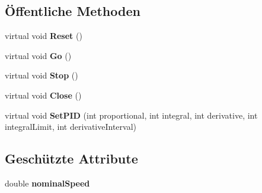 \subsection*{Öffentliche Methoden}
\begin{DoxyCompactItemize}
\item 
\hypertarget{class_robot_ctrl_1_1_motor_ctrl_a57b1bb7cb3895bc5d867848926b57f1e}{
virtual void {\bfseries Reset} ()}
\label{class_robot_ctrl_1_1_motor_ctrl_a57b1bb7cb3895bc5d867848926b57f1e}

\item 
\hypertarget{class_robot_ctrl_1_1_motor_ctrl_a1c2505454168fc2d4287fe7052425d4e}{
virtual void {\bfseries Go} ()}
\label{class_robot_ctrl_1_1_motor_ctrl_a1c2505454168fc2d4287fe7052425d4e}

\item 
\hypertarget{class_robot_ctrl_1_1_motor_ctrl_a4e61bcac558a43dd2d1470ded5fed820}{
virtual void {\bfseries Stop} ()}
\label{class_robot_ctrl_1_1_motor_ctrl_a4e61bcac558a43dd2d1470ded5fed820}

\item 
\hypertarget{class_robot_ctrl_1_1_motor_ctrl_aa4d43c3586f611f8ca12924b0a92189b}{
virtual void {\bfseries Close} ()}
\label{class_robot_ctrl_1_1_motor_ctrl_aa4d43c3586f611f8ca12924b0a92189b}

\item 
\hypertarget{class_robot_ctrl_1_1_motor_ctrl_ac6e7ec6b155d337dddf2fe1bc660c11b}{
virtual void {\bfseries SetPID} (int proportional, int integral, int derivative, int integralLimit, int derivativeInterval)}
\label{class_robot_ctrl_1_1_motor_ctrl_ac6e7ec6b155d337dddf2fe1bc660c11b}

\end{DoxyCompactItemize}
\subsection*{Geschützte Attribute}
\begin{DoxyCompactItemize}
\item 
\hypertarget{class_robot_ctrl_1_1_motor_ctrl_a62360699e5fbae4b92c21e4b8cc9c823}{
double {\bfseries nominalSpeed}}
\label{class_robot_ctrl_1_1_motor_ctrl_a62360699e5fbae4b92c21e4b8cc9c823}

\end{DoxyCompactItemize}
